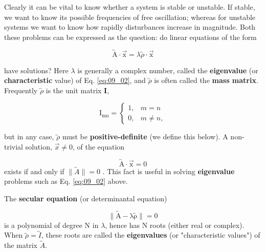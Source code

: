 Clearly it can be vital to know whether a system is stable or unstable. If stable, we want to know its possible frequencies of free oscillation; whereas for unstable systems we want to know how rapidly disturbances increase in magnitude. Both these problems can be expressed as the question: do linear equations of the form

\begin{equation}
    \boldsymbol{
        \mathrm{\overleftrightarrow{A}} \cdot \vec{\mathrm{x}}
        }
    = \lambda \overleftrightarrow{\rho} \cdot \boldsymbol{\vec{\mathrm{x}}}
    \label{eq:09_02}
\end{equation}

have solutions? Here $\lambda$ is generally a complex number, called the \textbf{eigenvalue} (or \textbf{characteristic} value) of Eq. \ref{eq:09_02}, and $\overleftrightarrow{\rho}$ is often called the \textbf{mass matrix}. Frequently $\overleftrightarrow{\rho}$ is the unit matrix \textbf{I},

\begin{equation}
    \mathrm{I_{mn}=}
\begin{cases}
     1, & m = n\\
     0, & m \neq n,
    \end{cases}
    \label{eq:09_03}
\end{equation}

but in any case, $\overleftrightarrow{\rho}$ must be \textbf{positive-definite} (we define this
below). A non-trivial solution, $\vec{x} \neq 0$, of the equation

\begin{equation}
    \label{eq:09_04}
    \mathrm{\overleftrightarrow{A}} \cdot \vec{\mathrm{x}} = 0
\end{equation}
exists if and only if $\lVert\overleftrightarrow{A}\rVert=0$ . This fact is useful in solving \textbf{eigenvalue} problems such as Eq. \ref{eq:09_02} above.


The \textbf{secular equation} (or determinantal equation)

\begin{equation}
    \label{eq:09_05}
    \mathrm{\lVert \overleftrightarrow{A} - \lambda \overleftrightarrow{\rho} \rVert = 0}
\end{equation}
is a polynomial of degree N in $\lambda$, hence has N roots (either real or
complex). When $\overleftrightarrow{\rho}=\overleftrightarrow{I}$, these roots are called the \textbf{eigenvalues}
(or "characteristic values") of the matrix $\overleftrightarrow{A}$.

